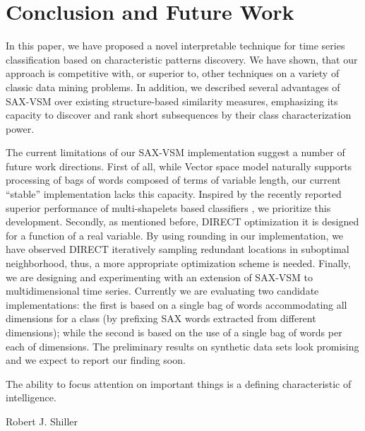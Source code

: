 \section{Conclusion and Future Work} \label{conclusion}
In this paper, we have proposed a novel interpretable technique for time series classification
based on characteristic patterns discovery. We have shown, that our approach is competitive with, 
or superior to, other techniques on a variety of classic data mining problems. In addition, 
we described several advantages of SAX-VSM over existing structure-based similarity measures,
emphasizing its capacity to discover and rank short subsequences by their class characterization
power.

The current limitations of our SAX-VSM implementation suggest a number of future work directions. 
First of all, while Vector space model naturally supports processing of bags of words composed 
of terms of variable length, our current ``stable'' implementation lacks this capacity.
Inspired by the recently reported superior performance of multi-shapelets based classifiers
\cite{citeulike:11345338}, we prioritize this development.
Secondly, as mentioned before, DIRECT optimization it is designed for a function of a real variable.
By using rounding in our implementation, we have observed DIRECT iteratively sampling redundant
locations in suboptimal neighborhood, thus, a more appropriate optimization scheme is needed.
Finally, we are designing and experimenting with an extension of SAX-VSM to multidimensional time
series. Currently we are evaluating two candidate implementations: the first is based on a
single bag of words accommodating all dimensions for a class (by prefixing SAX words extracted from
different dimensions); while the second is based on the use of a single bag of words per each of
dimensions. The preliminary results on synthetic data sets look promising and we expect to report 
our finding soon.

\epigraph{The ability to focus attention on important things is a defining characteristic of 
intelligence.}{Robert J. Shiller}
